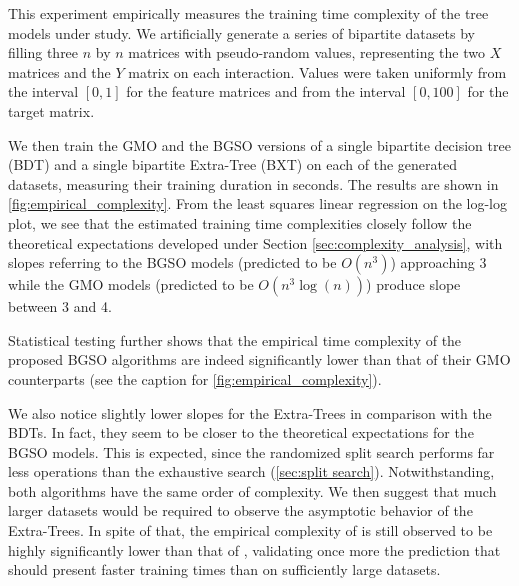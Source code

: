 This experiment empirically measures the training time complexity of the tree models under study. We artificially generate a series of bipartite datasets by filling three $n$ by $n$ matrices with pseudo-random values, representing the two $X$ matrices and the $Y$ matrix on each interaction. Values were taken uniformly from the interval $[0, 1]$ for the feature matrices and from the interval $[0, 100]$ for the target matrix.

We then train the GMO and the BGSO versions of a single bipartite decision tree (BDT) and a single bipartite Extra-Tree (BXT) on each of the generated datasets, measuring their training duration in seconds. The results are shown in \autoref{fig:empirical_complexity}. From the least squares linear regression on the log-log plot, we see that the estimated training time complexities closely follow the theoretical expectations developed under Section \ref{sec:complexity_analysis}, with slopes referring to the BGSO models (predicted to be $O(n^3)$) approaching 3 while the GMO models (predicted to be $O(n^3\log(n))$) produce slope between 3 and 4.

Statistical testing further shows that the empirical time complexity of the proposed BGSO algorithms are indeed significantly lower than that of their GMO counterparts (see the caption for \autoref{fig:empirical_complexity}).


We also notice slightly lower slopes for the Extra-Trees in comparison with the BDTs. In fact, they seem to be closer to the theoretical expectations for the BGSO models. This is expected,
since the randomized split search performs far less operations than the exhaustive search (\autoref{sec:split search}). Notwithstanding, both algorithms have the same order of complexity.
%
We then suggest that much larger datasets would be required to observe the asymptotic behavior of the Extra-Trees.
In spite of that, the empirical complexity of  is still observed to be highly significantly lower than that of , validating once more the prediction that  should present faster training times than  on sufficiently large datasets.

